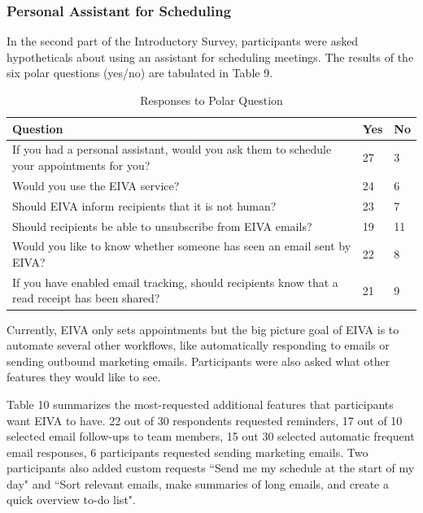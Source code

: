 \documentclass{article}
\begin{document}
\subsubsection{Personal Assistant for Scheduling}

In the second part of the Introductory Survey, participants were asked hypotheticals about using an assistant for scheduling meetings. The results of the six polar questions (yes/no) are tabulated in Table 9.

\begin{table}[!htb]
	\begin{minipage}{1\linewidth}
		\caption{Responses to Polar Question}
		\centering
		\begin{tabular}{p{9cm}p{0.75cm}p{0.75cm}}
			\hline
			\textbf{Question}                                                                               & \textbf{Yes} & \textbf{No} \\
			\hline
			If you had a personal assistant, would you ask them to schedule your appointments for you?      & 27           & 3           \\
			Would you use the EIVA service?                                                                 & 24           & 6           \\
			Should EIVA inform recipients that it is not human?                                             & 23           & 7           \\
			Should recipients be able to unsubscribe from EIVA emails?                                      & 19           & 11          \\
			Would you like to know whether someone has seen an email sent by EIVA?                          & 22           & 8           \\
			If you have enabled email tracking, should recipients know that a read receipt has been shared? & 21           & 9           \\
			\hline
		\end{tabular}
	\end{minipage}%
\end{table}

Currently, EIVA only sets appointments but the big picture goal of EIVA is to automate several other workflows, like automatically responding to emails or sending outbound marketing emails. Participants were also asked what other features they would like to see.

Table 10 summarizes the most-requested additional features that participants want EIVA to have. 22 out of 30 respondents requested reminders, 17 out of 10 selected email follow-ups to team members, 15 out 30 selected automatic frequent email responses, 6 participants requested sending marketing emails. Two participants also added custom requests ``Send me my schedule at the start of my day" and ``Sort relevant emails, make summaries of long emails, and create a quick overview to-do list".
\end{document}
